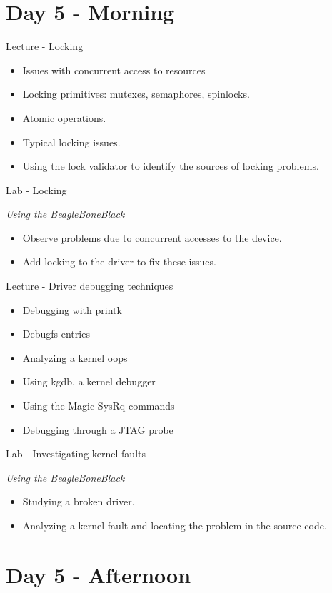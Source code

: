 \documentclass[a4paper,12pt,obeyspaces,spaces,hyphens]{article}
\begin{document}
\section{Day 5 - Morning}

\feagendatwocolumn
{Lecture - Locking}
{
  \begin{itemize}
  \item Issues with concurrent access to resources
  \item Locking primitives: mutexes, semaphores, spinlocks.
  \item Atomic operations.
  \item Typical locking issues.
  \item Using the lock validator to identify the sources of locking
    problems.
  \end{itemize}
}
{Lab - Locking}
{
  {\em Using the BeagleBoneBlack}
  \begin{itemize}
  \item Observe problems due to concurrent accesses to the device.
  \item Add locking to the driver to fix these issues.
  \end{itemize}
}

\feagendatwocolumn
{Lecture - Driver debugging techniques}
{
  \begin{itemize}
  \item Debugging with printk
  \item Debugfs entries
  \item Analyzing a kernel oops
  \item Using kgdb, a kernel debugger
  \item Using the Magic SysRq commands
  \item Debugging through a JTAG probe
  \end{itemize}
}
{Lab - Investigating kernel faults}
{
  {\em Using the BeagleBoneBlack}
  \begin{itemize}
  \item Studying a broken driver.
  \item Analyzing a kernel fault and locating the problem in the
    source code.
  \end{itemize}
}

\section{Day 5 - Afternoon}
\end{document}

